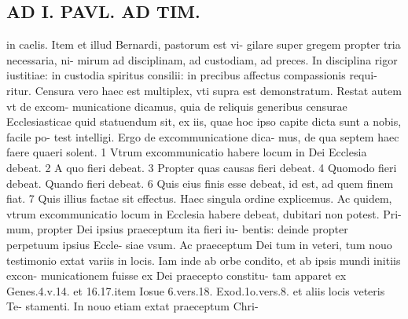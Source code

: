 \documentclass{article}
\begin{document}
\begin{pages}
\section*{AD I. PAVL. AD TIM. }
\marginpar{[ p.388 ]}\pstart in caelis. Item et illud Bernardi, pastorum est vi- gilare super gregem propter tria necessaria, ni- mirum ad disciplinam, ad custodiam, ad preces. In disciplina rigor iustitiae: in custodia spiritus consilii: in precibus affectus compassionis requi- ritur. Censura vero haec est multiplex, vti supra est demonstratum. Restat autem vt de excom- municatione dicamus, quia de reliquis generibus censurae Ecclesiasticae quid statuendum sit, ex iis, quae hoc ipso capite dicta sunt a nobis, facile po- test intelligi. Ergo de excommunicatione dica- mus, de qua septem haec faere quaeri solent. 1 Vtrum excommunicatio habere locum in Dei Ecclesia debeat. 2 A quo fieri debeat. 3 Propter quas causas fieri debeat. 4 Quomodo fieri debeat. Quando fieri debeat. 6 Quis eius finis esse debeat, id est, ad quem finem fiat. 7 Quis illius factae sit effectus. Haec singula ordine explicemus. Ac quidem, vtrum excommunicatio locum in Ecclesia habere debeat, dubitari non potest. Pri- mum, propter Dei ipsius praeceptum ita fieri iu- bentis: deinde propter perpetuum ipsius Eccle- siae vsum. Ac praeceptum Dei tum in veteri, tum nouo testimonio extat variis in locis. Iam inde ab orbe condito, et ab ipsis mundi initiis excon- municationem fuisse ex Dei praecepto constitu- tam apparet ex Genes.4.v.14. et 16.17.item Iosue 6.vers.18. Exod.1o.vers.8. et aliis locis veteris Te- stamenti. In nouo etiam extat praeceptum Chri-  \pend

\end{pages}
\end{document}

